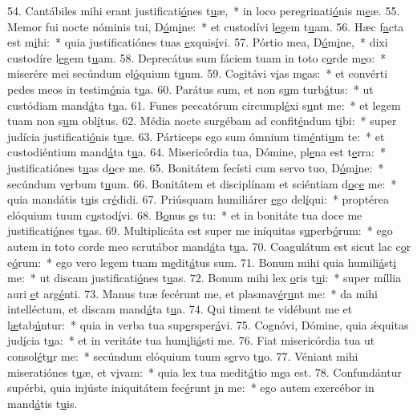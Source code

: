 54. Cantábiles mihi erant justificati\uline{ó}nes t\uline{u}æ,~* in loco peregrinati\uline{ó}nis m\uline{e}æ.
55. Memor fui nocte nóminis tui, D\uline{ó}m\uline{i}ne:~* et custodívi l\uline{e}gem t\uline{u}am.
56. Hæc f\uline{a}cta est m\uline{i}hi:~* quia justificatiónes tuas \uline{e}xquis\uline{í}vi.
57. Pórtio mea, D\uline{ó}m\uline{i}ne,~* dixi custodíre l\uline{e}gem t\uline{u}am.
58. Deprecátus sum fáciem tuam in toto c\uline{o}rde m\uline{e}o:~* miserére mei secúndum el\uline{ó}quium t\uline{u}um.
59. Cogitávi v\uline{i}as m\uline{e}as:~* et convérti pedes meos in testim\uline{ó}nia t\uline{u}a.
60. Parátus sum, et non s\uline{u}m turb\uline{á}tus:~* ut custódiam mand\uline{á}ta t\uline{u}a.
61. Funes peccatórum circumpl\uline{é}xi s\uline{u}nt me:~* et legem tuam non s\uline{u}m obl\uline{í}tus.
62. Média nocte surgébam ad confit\uline{é}ndum t\uline{i}bi:~* super judícia justificati\uline{ó}nis t\uline{u}æ.
63. Párticeps ego sum ómnium tim\uline{é}nti\uline{u}m te:~* et custodiéntium mand\uline{á}ta t\uline{u}a.
64. Misericórdia tua, Dómine, pl\uline{e}na est t\uline{e}rra:~* justificatiónes t\uline{u}as d\uline{o}ce me.
65. Bonitátem fecísti cum servo tuo, D\uline{ó}m\uline{i}ne:~* secúndum v\uline{e}rbum t\uline{u}um.
66. Bonitátem et disciplínam et sciéntiam d\uline{o}c\uline{e} me:~* quia mandátis t\uline{u}is cr\uline{é}didi.
67. Priúsquam humiliárer \uline{e}go del\uline{í}qui:~* proptérea elóquium tuum c\uline{u}stod\uline{í}vi.
68. B\uline{o}nus \uline{e}s tu:~* et in bonitáte tua doce me justificati\uline{ó}nes t\uline{u}as.
69. Multiplicáta est super me iníquitas s\uline{u}perb\uline{ó}rum:~* ego autem in toto corde meo scrutábor mand\uline{á}ta t\uline{u}a.
70. Coagulátum est sicut lac c\uline{o}r e\uline{ó}rum:~* ego vero legem tuam m\uline{e}dit\uline{á}tus sum.
71. Bonum mihi quia humili\uline{á}st\uline{i} me:~* ut discam justificati\uline{ó}nes t\uline{u}as.
72. Bonum mihi lex \uline{o}ris t\uline{u}i:~* super míllia auri \uline{e}t arg\uline{é}nti.
73. Manus tuæ fecérunt me, et plasmav\uline{é}r\uline{u}nt me:~* da mihi intelléctum, et discam mand\uline{á}ta t\uline{u}a.
74. Qui timent te vidébunt me et l\uline{æ}tab\uline{ú}ntur:~* quia in verba tua sup\uline{e}rsper\uline{á}vi.
75. Cognóvi, Dómine, quia ǽquitas jud\uline{í}cia t\uline{u}a:~* et in veritáte tua hum\uline{i}li\uline{á}sti me.
76. Fiat misericórdia tua ut consol\uline{é}t\uline{u}r me:~* secúndum elóquium tuum s\uline{e}rvo t\uline{u}o.
77. Véniant mihi miseratiónes t\uline{u}æ, et v\uline{i}vam:~* quia lex tua medit\uline{á}tio m\uline{e}a est.
78. Confundántur supérbi, quia injúste iniquitátem fec\uline{é}runt \uline{i}n me:~* ego autem exercébor in mand\uline{á}tis t\uline{u}is.
